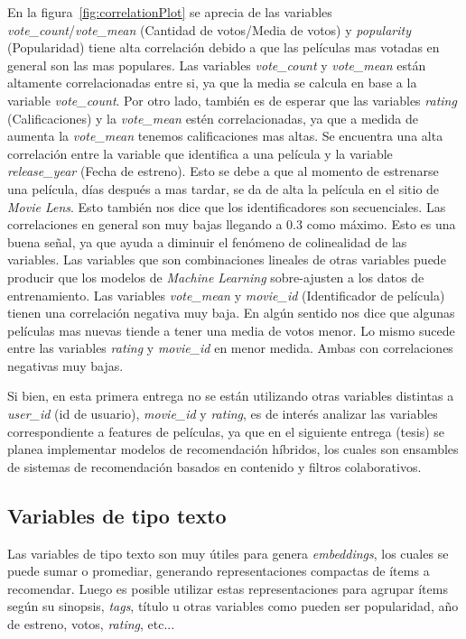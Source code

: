 \documentclass[11pt,a4paper,twoside]{thesis}
\begin{document}
En la figura~\ref{fig:correlationPlot} se aprecia de las variables
\textit{vote\_count}/\textit{vote\_mean} (Cantidad de votos/Media de votos) y
\textit{popularity} (Popularidad) tiene alta correlación debido a que las
películas mas votadas en general son las mas populares. Las variables
\textit{vote\_count} y \textit{vote\_mean} están altamente correlacionadas
entre si, ya que la media se calcula en base a la variable
\textit{vote\_count}. Por otro lado, también es de esperar que las variables
\textit{rating} (Calificaciones) y la \textit{vote\_mean} estén
correlacionadas, ya que a medida de aumenta la \textit{vote\_mean} tenemos
calificaciones mas altas. Se encuentra una alta correlación entre la variable
que identifica a una película y la variable \textit{release\_year} (Fecha de
estreno). Esto se debe a que al momento de estrenarse una película, días
después a mas tardar, se da de alta la película en el sitio de \textit{Movie
	Lens}. Esto también nos dice que los identificadores son secuenciales. Las
correlaciones en general son muy bajas llegando a $0.3$ como máximo. Esto es
una buena señal, ya que ayuda a diminuir el fenómeno de colinealidad de las
variables. Las variables que son combinaciones lineales de otras variables
puede producir que los modelos de \textit{Machine Learning} sobre-ajusten a los
datos de entrenamiento. Las variables \textit{vote\_mean} y \textit{movie\_id}
(Identificador de película) tienen una correlación negativa muy baja. En algún
sentido nos dice que algunas películas mas nuevas tiende a tener una media de
votos menor. Lo mismo sucede entre las variables \textit{rating} y
\textit{movie\_id} en menor medida. Ambas con correlaciones negativas muy
bajas.

Si bien, en esta primera entrega no se están utilizando otras variables
distintas a \textit{user\_id} (id de usuario), \textit{movie\_id} y
\textit{rating}, es de interés analizar las variables correspondiente a
features de películas, ya que en el siguiente entrega (tesis) se planea
implementar modelos de recomendación híbridos, los cuales son ensambles de
sistemas de recomendación basados en contenido y filtros colaborativos.

\subsection{Variables de tipo texto}

Las variables de tipo texto son muy útiles para genera \textit{embeddings}, los
cuales se puede sumar o promediar, generando representaciones compactas de
ítems a recomendar. Luego es posible utilizar estas representaciones para
agrupar ítems según su sinopsis, \textit{tags}, título u otras variables como
pueden ser popularidad, año de estreno, votos, \textit{rating}, etc...
\end{document}
